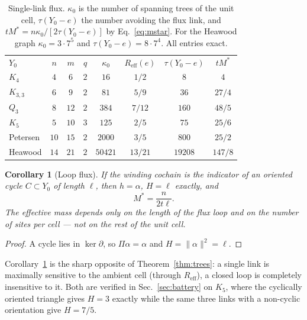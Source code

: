 \documentclass[aps,prb,reprint,amsmath,amssymb,floatfix,superscriptaddress]{revtex4-2}
\theoremstyle{plain}
\newtheorem{corollary}[theorem]{Corollary}
\theoremstyle{definition}
\theoremstyle{remark}
\newcommand{\Reff}{R_{\mathrm{eff}}}
\begin{document}
\begin{table}[t]
\centering
\begin{ruledtabular}
\begin{tabular}{lccccccc}
$Y_0$ & $n$ & $m$ & $q$ & $\kappa_0$ & $\Reff(e)$ & $\tau(Y_0-e)$ & $tM^{*}$\\
\colrule
$K_4$        & $4$  & $6$  & $2$ & $16$    & $1/2$   & $8$     & $4$\\
$K_{3,3}$    & $6$  & $9$  & $2$ & $81$    & $5/9$   & $36$    & $27/4$\\
$Q_3$        & $8$  & $12$ & $2$ & $384$   & $7/12$  & $160$   & $48/5$\\
$K_5$        & $5$  & $10$ & $3$ & $125$   & $2/5$   & $75$    & $25/6$\\
Petersen     & $10$ & $15$ & $2$ & $2000$  & $3/5$   & $800$   & $25/2$\\
Heawood      & $14$ & $21$ & $2$ & $50421$ & $13/21$ & $19208$ & $147/8$\\
\end{tabular}
\end{ruledtabular}
\caption{Single-link flux. $\kappa_0$ is the number of spanning trees of the unit cell,
$\tau(Y_0-e)$ the number avoiding the flux link, and $tM^{*}=n\kappa_0/[2\tau(Y_0-e)]$ by
Eq.~\eqref{eq:mstar}. For the Heawood graph $\kappa_0=3\cdot7^{5}$ and
$\tau(Y_0-e)=8\cdot7^{4}$. All entries exact.}
\label{tab:trees}
\end{table}

\begin{corollary}[Loop flux]\label{cor:loop}
If the winding cochain is the indicator of an oriented cycle $C\subset Y_0$ of length
$\ell$, then $h=\alpha$, $H=\ell$ exactly, and
\begin{equation}
M^{*}=\frac{n}{2t\ell} .
\end{equation}
The effective mass depends only on the length of the flux loop and on the number of sites
per cell --- not on the rest of the unit cell.
\end{corollary}

\begin{proof}
A cycle lies in $\ker\partial$, so $\Pi\alpha=\alpha$ and $H=\|\alpha\|^{2}=\ell$.
\end{proof}

Corollary~\ref{cor:loop} is the sharp opposite of Theorem~\ref{thm:trees}: a single link is
maximally sensitive to the ambient cell (through $\Reff$), a closed loop is completely
insensitive to it. Both are verified in Sec.~\ref{sec:battery} on $K_5$, where the
cyclically oriented triangle gives $H=3$ exactly while the same three links with a
non-cyclic orientation give $H=7/5$.
\end{document}
